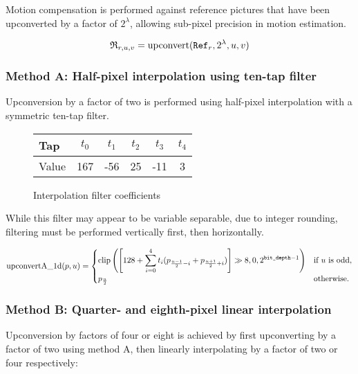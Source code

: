 Motion compensation is performed against reference pictures that have
been upconverted by a factor of $2^\lambda$, allowing sub-pixel
precision in motion estimation.

\begin{equation*}
\mathfrak{R}_{r,u,v} = \text{upconvert}(\text{\texttt{Ref}}_r,2^\lambda,u,v)
\end{equation*}

\subsubsection{Method A: Half-pixel interpolation using ten-tap filter}
Upconversion by a factor of two is performed using half-pixel
interpolation with a symmetric ten-tap filter.

\begin{figure}[h!]
\begin{centering}
\begin{tabular}{l|ccccc}
Tap & $t_0$ & $t_1$ & $t_2$ & $t_3$ & $t_4$\\
\hline
Value & 167 & -56 & 25 & -11 & 3
\end{tabular}
\caption{Interpolation filter coefficients}
\end{centering}
\end{figure}

While this filter may appear to be variable separable, due to integer
rounding, filtering must be performed vertically first, then horizontally.

\begin{equation*}
\text{upconvertA\_1d}(p,u) =
  \begin{cases}
    \displaystyle
    \operatorname{clip}\left(\left[128
          + \sum_{i=0}^{4} t_i (p_{\frac{u-1}{2}-i} + p_{\frac{u+1}{2}+i})
          \right] \gg 8, 0, 2^{\text{\texttt{bit\_depth}}-1} \right) & \text{if $u$ is odd},\\
    p_{\frac{u}{2}} & \text{otherwise}.
  \end{cases}
\end{equation*}


\subsubsection{Method B: Quarter- and eighth-pixel linear interpolation}
Upconversion by factors of four or eight is achieved by first
upconverting by a factor of two using method A, then linearly interpolating by a
factor of two or four respectively:


